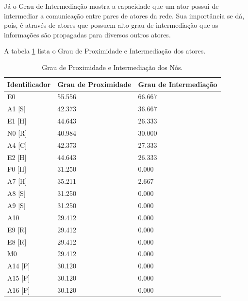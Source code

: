 Já o Grau de Intermediação mostra a capacidade que um ator possui de intermediar a comunicação entre pares de atores da rede. Sua importância se dá, pois, é através de atores que possuem alto grau de intermediação que as informações são propagadas para diversos outros atores. 

A tabela \ref{closeness-betweeness-degree} lista o Grau de Proximidade e Intermediação dos atores.

\begin{table}[htbp]
\centering
\caption{Grau de Proximidade e Intermediação dos Nós.}
\label{closeness-betweeness-degree}
\begin{tabular}{|l|l|l|}
\hline
Identificador & Grau de Proximidade & Grau de Intermediação \\ \hline
E0            & 55.556              & 66.667                \\ \hline
A1 {[}S{]}    & 42.373              & 36.667                \\ \hline
E1 {[}H{]}    & 44.643              & 26.333                \\ \hline
N0 {[}R{]}    & 40.984              & 30.000                \\ \hline
A4 {[}C{]}    & 42.373              & 27.333                \\ \hline
E2 {[}H{]}    & 44.643              & 26.333                \\ \hline
F0 {[}H{]}    & 31.250              & 0.000                 \\ \hline
A7 {[}H{]}    & 35.211              & 2.667                 \\ \hline
A8 {[}S{]}    & 31.250              & 0.000                 \\ \hline
A9 {[}S{]}    & 31.250              & 0.000                 \\ \hline
A10           & 29.412              & 0.000                 \\ \hline
E9 {[}R{]}    & 29.412              & 0.000                 \\ \hline
E8 {[}R{]}    & 29.412              & 0.000                 \\ \hline
M0            & 29.412              & 0.000                 \\ \hline
A14 {[}P{]}   & 30.120              & 0.000                 \\ \hline
A15 {[}P{]}   & 30.120              & 0.000                 \\ \hline
A16 {[}P{]}   & 30.120              & 0.000                 \\ \hline

\end{tabular}
\end{table}
